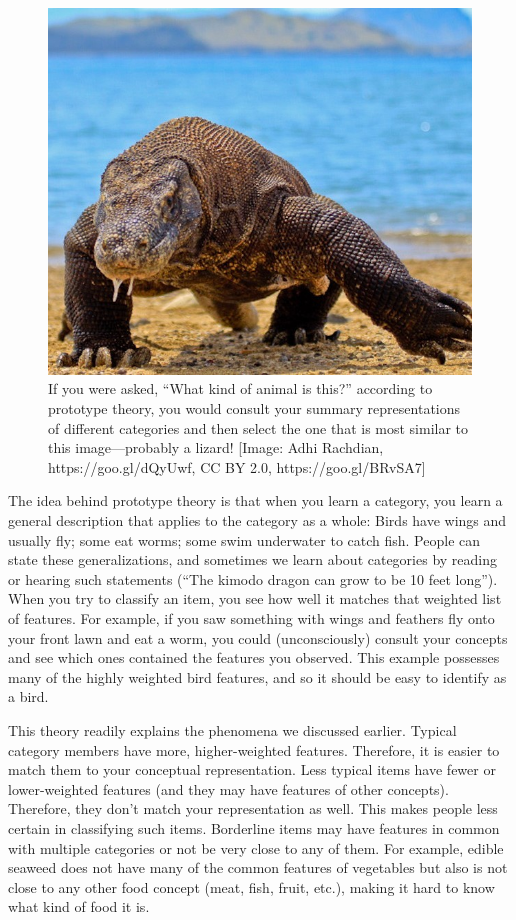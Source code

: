 \documentclass[
]{krantz}
\begin{document}
\begin{figure}

{\centering \includegraphics[width=0.6\linewidth]{images/ch7/lizard} 

}

\caption{If you were asked, “What kind of animal is this?” according to prototype theory, you would consult your summary representations of different categories and then select the one that is most similar to this image—probably a lizard! [Image: Adhi Rachdian, https://goo.gl/dQyUwf, CC BY 2.0, https://goo.gl/BRvSA7] }\label{fig:lizard}
\end{figure}

The idea behind prototype theory is that when you learn a category, you learn a general description that applies to the category as a whole: Birds have wings and usually fly; some eat worms; some swim underwater to catch fish. People can state these generalizations, and sometimes we learn about categories by reading or hearing such statements (``The kimodo dragon can grow to be 10 feet long'').
When you try to classify an item, you see how well it matches that weighted list of features. For example, if you saw something with wings and feathers fly onto your front lawn and eat a worm, you could (unconsciously) consult your concepts and see which ones contained the features you observed. This example possesses many of the highly weighted bird features, and so it should be easy to identify as a bird.

This theory readily explains the phenomena we discussed earlier. Typical category members have more, higher-weighted features. Therefore, it is easier to match them to your conceptual representation. Less typical items have fewer or lower-weighted features (and they may have features of other concepts). Therefore, they don't match your representation as well. This makes people less certain in classifying such items. Borderline items may have features in common with multiple categories or not be very close to any of them. For example, edible seaweed does not have many of the common features of vegetables but also is not close to any other food concept (meat, fish, fruit, etc.), making it hard to know what kind of food it is.
\end{document}
